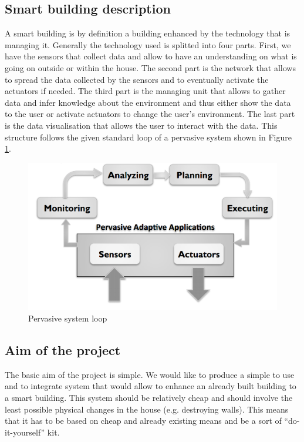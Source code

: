 \documentclass{acm_proc_article-sp}
\begin{document}
\subsection{Smart building description}
A smart building is by definition a building enhanced by the technology that is managing it. 
Generally the technology used is splitted into four parts. 
First, we have the sensors that collect data and allow to have an understanding on what is going on outside or within the house. 
The second part is the network that allows to spread the data collected by the sensors and to eventually activate the actuators if needed. 
The third part is the managing unit that allows to gather data and infer knowledge about the environment and thus either show the data to the user or activate actuators to change the user’s environment. 
The last part is the data visualisation that allows the user to interact with the data.
This structure follows the given standard loop of a pervasive system shown in Figure \ref{loop}.
				\begin{figure}[htb]
  				\begin{center}
    				\includegraphics[width=\linewidth]{loop}
    				\caption{Pervasive system loop \label{loop}}
  				\end{center}
				\end{figure}
\subsection{Aim of the project}
The basic aim of the project is simple.
We would like to produce a simple to use and to integrate system that would allow to enhance an already built building to a smart building. 
This system should be relatively cheap and should involve the least possible physical changes in the house (e.g. destroying walls).
This means that it has to be based on cheap and already existing means and be a sort of “do-it-yourself” kit.
\end{document}
